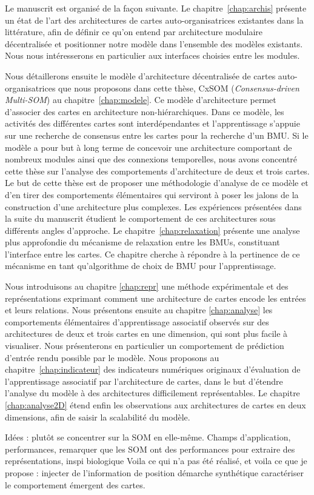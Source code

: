 Le manuscrit est organisé de la façon suivante.
Le chapitre~\ref{chap:archis} présente un état de l'art des architectures de cartes auto-organisatrices existantes dans la littérature, afin de définir ce qu'on entend par architecture modulaire décentralisée et positionner notre modèle dans l'ensemble des modèles existants. Nous nous intéresserons en particulier aux interfaces choisies entre les modules.

Nous détaillerons ensuite le modèle d'architecture décentralisée de cartes auto-organisatrices que nous proposons dans cette thèse, CxSOM (\emph{Consensus-driven Multi-SOM}) au chapitre~\ref{chap:modele}.
Ce modèle d'architecture permet d'associer des cartes en architecture non-hiérarchiques. Dans ce modèle, les activités des différentes cartes sont interdépendantes et l'apprentissage s'appuie sur une recherche de consensus entre les cartes pour la recherche d'un BMU.
Si le modèle a pour but à long terme de concevoir une architecture comportant de nombreux modules ainsi que des connexions temporelles, nous avons concentré cette thèse sur l'analyse des comportements d'architecture de deux et trois cartes.
Le but de cette thèse est de proposer une méthodologie d'analyse de ce modèle et d'en tirer des comportements élémentaires qui serviront à poser les jalons de la construction d'une architecture plus complexes.
Les expériences présentées dans la suite du manuscrit étudient le comportement de ces architectures sous différents angles d'approche.
Le chapitre~\ref{chap:relaxation} présente une analyse plus approfondie du mécanisme de relaxation entre les BMUs, constituant l'interface entre les cartes. 
Ce chapitre cherche à répondre à la pertinence de ce mécanisme en tant qu'algorithme de choix de BMU pour l'apprentissage.

Nous introduisons au chapitre \ref{chap:repr} une méthode expérimentale et des représentations exprimant comment une architecture de cartes encode les entrées et leurs relations.
Nous présentons ensuite au chapitre \ref{chap:analyse} les comportements élémentaires d'apprentissage associatif observés sur des architectures de deux et trois cartes en une dimension, qui sont plus facile à visualiser. 
Nous présenterons en particulier un comportement de prédiction d'entrée rendu possible par le modèle.
Nous proposons au chapitre~\ref{chap:indicateur} des indicateurs numériques originaux d'évaluation de l'apprentissage associatif par l'architecture de cartes, dans le but d'étendre l'analyse du modèle à des architectures difficilement représentables.
Le chapitre \ref{chap:analyse2D} étend enfin les observations aux architectures de cartes en deux dimensions, afin de saisir la scalabilité du modèle.




Idées : plutôt se concentrer sur la SOM en elle-même. Champs d'application, performances, remarquer que les SOM ont des performances pour extraire des représentations, inspi biologique
Voila ce qui n'a pas été réalisé, et voila ce que je propose : injecter de l'information de position 
démarche synthétique
caractériser le comportement émergent des cartes.